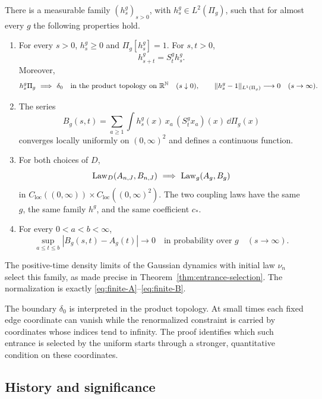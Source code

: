 \newpage
\begin{theorem}\label{thm:main}
There is a measurable family \((h_s^g)_{s>0}\), with
\(h_s^g\in L^2(\Pi_g)\), such that for almost every \(g\) the following
properties hold.
\begin{enumerate}
\item For every \(s>0\), \(h_s^g\ge0\) and \(\Pi_g[h_s^g]=1\). For
      \(s,t>0\),
      \[
       h_{s+t}^g=S_t^g h_s^g.
      \]
      Moreover,
      \[
       h_s^g\Pi_g\ \Longrightarrow\ \delta_0
       \quad\text{in the product topology on }\mathbb R^\mathbb N
       \quad(s\downarrow0),
       \qquad
       \|h_s^g-1\|_{L^1(\Pi_g)}\longrightarrow0
       \quad(s\to\infty).
      \]
\item The series
      \begin{equation}\label{eq:limit-B}
       B_g(s,t)=\sum_{a\ge1}
          \int h_s^g(x)\,x_a\,(S_t^g x_a)(x)\,\dd\Pi_g(x)
      \end{equation}
      converges locally uniformly on \((0,\infty)^2\) and defines a
      continuous function.
\item For both choices of \(D\),
      \[
       \operatorname{Law}_D(A_{n,J},B_{n,J})
       \ \Longrightarrow\
       \operatorname{Law}_g(A_g,B_g)
      \]
      in
      \(C_{\mathrm{loc}}((0,\infty))
        \times C_{\mathrm{loc}}((0,\infty)^2)\).
      The two coupling laws have the same \(g\), the same family
      \(h^g\), and the same coefficient \(c_*\).
\item For every \(0<a<b<\infty\),
      \[
       \sup_{a\le t\le b}|B_g(s,t)-A_g(t)|
          \longrightarrow0
       \quad\text{in probability over }g
       \quad(s\to\infty).
      \]
\end{enumerate}
The positive-time density limits of the Gaussian dynamics with initial
law \(\nu_n\) select this family, as made precise in
Theorem~\ref{thm:entrance-selection}. The normalization is exactly
\eqref{eq:finite-A}--\eqref{eq:finite-B}.
\end{theorem}

The boundary \(\delta_0\) is interpreted in the product topology.
At small times each fixed edge coordinate can vanish while the
renormalized constraint is carried by coordinates whose indices tend
to infinity. The proof identifies which such entrance is selected by
the uniform starts through a stronger, quantitative condition on these
coordinates.

\subsection{History and significance}

